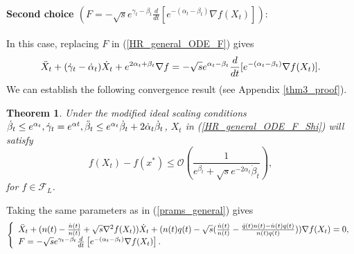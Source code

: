 \documentclass{article}
\theoremstyle{plain}
\newtheorem{theorem}{Theorem}[section]
\theoremstyle{definition}
\theoremstyle{remark}
\begin{document}
\paragraph{Second choice \( ({F = -\sqrt{s}e^{\gamma_t-\beta_t}\frac{d}{dt}\left[e^{-(\alpha_t-\beta_t)}\nabla f(X_t)\right]}):\)}
    In this case, replacing $F$ in (\ref{HR_general_ODE_F}) gives
    \begin{align}\label{HR_general_ODE_F_Shi}
    \Ddot{X}_t + (\dot{\gamma}_t-\dot{\alpha}_t)\dot{X}_t+e^{2\alpha_t+\beta_t}\nabla f = -\sqrt{s}e^{\alpha_t-\beta_t}\frac{d}{dt}[e^{-(\alpha_t-\beta_t)}\nabla f(X_t)].
\end{align}
We can establish the following convergence result (see Appendix \ref{thm3_proof}).\begin{theorem}\label{Theorem_ODE_Shi}
Under the modified ideal scaling conditions \(\dot\beta_t\leq e^{\alpha_t}, \dot\gamma_t=e^{\alpha t}, \Ddot{\beta}_t\leq e^{\alpha_t}\dot \beta_t + 2\dot \alpha_t \dot \beta_t\), \(X_t\) in (\ref{HR_general_ODE_F_Shi}) will satisfy 
\[f(X_t)-f(x^*)\leq \mathcal{O}\left(\frac{1}{e^{\beta_t}+\sqrt{s}e^{-2\alpha_t}\dot \beta_t}\right),\]
for \(f \in \mathcal{F}_L\).
\end{theorem}
 Taking the same parameters as in (\ref{prams_general}) gives
\begin{gather}
    \begin{aligned}\label{HR_cnts_general_npq_SHI}
\left\{
\begin{array}{l}
     \Ddot{X}_t + (n(t)-\frac{\dot n(t)}{n(t)}+\sqrt{s}\nabla^2 f(X_t))\dot{X}_t+(n(t)q(t)-\sqrt{s} (\frac{\dot n(t)}{n(t)}-\frac{\dot q(t)n(t)-\dot n(t)q(t)}{n(t)q(t)}))\nabla f(X_t)=0,   \\
     F = -\sqrt{s}e^{\gamma_t-\beta_t}\frac{d}{dt}\left[e^{-(\alpha_t-\beta_t)}\nabla f(X_t)\right]. 
\end{array}\right.\raisetag{12pt}
\end{aligned}
\end{gather}
 
\end{document}
